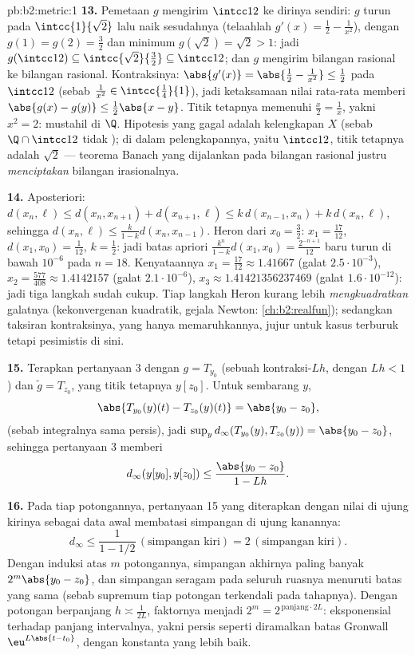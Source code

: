 \begin{solution}{pb:b2:metric:1}
\textbf{13.} Pemetaan $g$ mengirim $\intcc12$ ke dirinya sendiri: $g$
turun pada $\intcc{1}{\sqrt2}$ lalu naik sesudahnya (telaahlah $g'(x) =
\frac12 - \frac1{x^2}$), dengan $g(1) = g(2) = \frac32$ dan minimum
$g(\sqrt2) = \sqrt2 > 1$: jadi $g(\intcc12) \subseteq
\intcc{\sqrt2}{\frac32} \subseteq \intcc12$; dan $g$ mengirim
bilangan rasional ke bilangan rasional. Kontraksinya: $\abs{g'(x)} =
\abs{\frac12 - \frac1{x^2}} \leq \frac12$ pada $\intcc12$ (sebab
$\frac1{x^2} \in \intcc{\frac14}{1}$), jadi ketaksamaan nilai rata-rata
memberi $\abs{g(x) - g(y)} \leq \frac12\abs{x - y}$. Titik tetapnya
memenuhi $\frac x2 = \frac1x$, yakni $x^2 = 2$: mustahil di
$\Q$. Hipotesis yang gagal adalah kelengkapan $X$ (sebab $\Q \cap
\intcc12$ tidak ); di dalam pelengkapannya, yaitu $\intcc12$,
titik tetapnya adalah $\sqrt2$ --- teorema Banach yang dijalankan pada
bilangan rasional justru \emph{menciptakan} bilangan irasionalnya.

\textbf{14.} Aposteriori: $d(x_n, \ell) \leq d(x_n, x_{n+1}) +
d(x_{n+1}, \ell) \leq k\,d(x_{n-1}, x_n) + k\,d(x_n, \ell)$,
sehingga $d(x_n, \ell) \leq \frac{k}{1-k}d(x_n, x_{n-1})$. Heron
dari $x_0 = \frac32$: $x_1 = \frac{17}{12}$, $d(x_1, x_0) =
\frac1{12}$, $k = \frac12$: jadi batas apriori
$\frac{k^n}{1-k}d(x_1,x_0) = \frac{2^{-n+1}}{12}$ baru turun di bawah
$10^{-6}$ pada $n = 18$. Kenyataannya $x_1 = \frac{17}{12}
\approx 1.41667$ (galat $2.5\cdot10^{-3}$), $x_2 =
\frac{577}{408} \approx 1.4142157$ (galat $2.1\cdot10^{-6}$),
$x_3 \approx 1.41421356237469$ (galat $1.6\cdot10^{-12}$):
jadi tiga langkah sudah cukup. Tiap langkah Heron kurang lebih
\emph{mengkuadratkan} galatnya (kekonvergenan kuadratik, gejala Newton:
\cref{ch:b2:realfun}); sedangkan taksiran kontraksinya, yang hanya
memaruhkannya, jujur untuk kasus terburuk tetapi pesimistis di sini.

\textbf{15.} Terapkan pertanyaan 3 dengan $g = T_{y_0}$ (sebuah
kontraksi-$Lh$, dengan $Lh < 1$) dan $\widetilde g = T_{z_0}$, yang
titik tetapnya $y[z_0]$. Untuk sembarang $y$,
\[
\abs{T_{y_0}(y)(t) - T_{z_0}(y)(t)} = \abs{y_0 - z_0},
\]
(sebab integralnya sama persis), jadi $\sup_y
d_\infty(T_{y_0}(y), T_{z_0}(y)) = \abs{y_0 - z_0}$, sehingga
pertanyaan 3 memberi
\[
d_\infty(y[y_0], y[z_0]) \leq \frac{\abs{y_0 - z_0}}{1 - Lh} .
\]

\textbf{16.} Pada tiap potongannya, pertanyaan 15 yang diterapkan dengan
nilai di ujung kirinya sebagai data awal membatasi simpangan di
ujung kanannya:
\[
d_\infty \leq \frac{1}{1 - 1/2}\,(\text{simpangan kiri})
= 2\,(\text{simpangan kiri}) .
\] Dengan
induksi atas $m$ potongannya, simpangan akhirnya paling banyak
$2^m\abs{y_0 - z_0}$, dan simpangan seragam pada seluruh
ruasnya menuruti batas yang sama (sebab supremum tiap potongan terkendali
pada tahapnya). Dengan potongan berpanjang $h \asymp \frac1{2L}$,
faktornya menjadi $2^m = 2^{\,\text{panjang}\cdot 2L}$: eksponensial
terhadap panjang intervalnya, yakni persis seperti diramalkan batas Gronwall
$\eu^{L\abs{t-t_0}}$, dengan konstanta yang lebih baik.


\end{solution}
